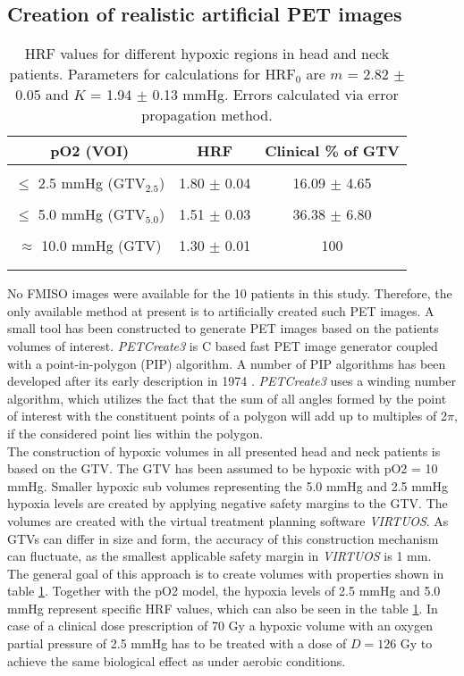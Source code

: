 \subsection{Creation of realistic artificial PET images}
\begin{table}[b]
\centering
\small
\begin{tabular}{ccc}
\toprule
pO2 (VOI) & HRF & Clinical \% of GTV\\
\midrule\\
$\leq$ 2.5 mmHg (GTV$_{2.5}$) & 1.80 $\pm$ 0.04 & 16.09 $\pm$ 4.65\\\\
$\leq$ 5.0 mmHg (GTV$_{5.0}$) & 1.51 $\pm$ 0.03 & 36.38 $\pm$ 6.80\\\\
$\approx$ 10.0 mmHg (GTV)& 1.30 $\pm$ 0.01 & 100\\\\
\bottomrule\\
\end{tabular}
\caption{HRF values for different hypoxic regions in head and neck patients. Parameters for calculations for HRF$_0$ are $m$ = 2.82 $\pm$ 0.05 and $K$ = 1.94 $\pm$ 0.13 mmHg. Errors calculated via error propagation method.}
\label{tab:HRFparameters}
\end{table}
No FMISO images were available for the 10 patients in this study. Therefore, the only available method at present is to artificially created such PET images. A small tool has been constructed to generate PET images based on the patients volumes of interest. \textit{PETCreate3} is C based fast PET image generator coupled with a point-in-polygon (PIP) algorithm. A number of PIP algorithms has been developed after its early description in 1974 \cite{Sutherland}. \textit{PETCreate3} uses a winding number algorithm, which utilizes the fact that the sum of all angles formed by the point of interest with the constituent points of a polygon will add up to multiples of 2$\pi$, if the considered point lies within the polygon.\\The construction of hypoxic volumes in all presented head and neck patients is based on the GTV. The GTV has been assumed to be hypoxic with  pO2 = 10 mmHg. Smaller hypoxic sub volumes representing the 5.0 mmHg and 2.5 mmHg hypoxia levels are created by applying negative safety margins to the GTV. The volumes are created with the virtual treatment planning software \textit{VIRTUOS}. As GTVs can differ in size and form, the accuracy of this construction mechanism can fluctuate, as the smallest applicable safety margin in \textit{VIRTUOS} is 1 mm.\\The general goal of this approach is to create volumes with properties shown in table \ref{tab:HRFparameters}. Together with the pO2 model, the hypoxia levels of 2.5 mmHg and 5.0 mmHg represent specific HRF values, which can also be seen in the table \ref{tab:HRFparameters}. In case of a clinical dose prescription of 70 Gy a hypoxic volume with an oxygen partial pressure of 2.5 mmHg has to be treated with a dose of $D=126$ Gy to achieve the same biological effect as under aerobic conditions.
